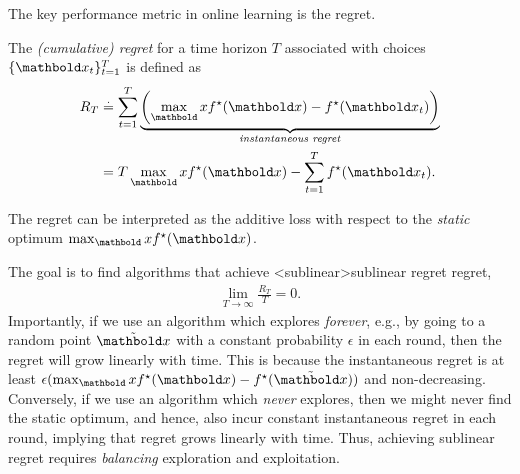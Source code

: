 The key performance metric in online learning is the regret.

\begin{defn}[Regret]
  The \emph{(cumulative) regret} for a time horizon $T$ associated with choices $\{\vx_t\}_{t=1}^T$ is defined as \begin{align}
    R_T &\defeq \sum_{t=1}^T \underbrace{\parentheses*{\max_\vx \opt{f}(\vx) - \opt{f}(\vx_t)}}_{\text{\midx{instantaneous regret}}} \\
    &= T \max_\vx \opt{f}(\vx) - \sum_{t=1}^T \opt{f}(\vx_t). \label{eq:regret2}
  \end{align}
\end{defn}
The regret can be interpreted as the additive loss with respect to the \emph{static} optimum $\max_\vx \opt{f}(\vx)$.

The goal is to find algorithms that achieve \midx<sublinear>{sublinear regret} regret, \begin{align}
  \lim_{T\to\infty} \frac{R_T}{T} = 0.
\end{align}
Importantly, if we use an algorithm which explores \emph{forever}, e.g., by going to a random point $\tilde{\vx}$ with a constant probability $\epsilon$ in each round, then the regret will grow linearly with time.
This is because the instantaneous regret is at least $\epsilon (\max_\vx \opt{f}(\vx) - \opt{f}(\tilde{\vx}))$ and non-decreasing.
Conversely, if we use an algorithm which \emph{never} explores, then we might never find the static optimum, and hence, also incur constant instantaneous regret in each round, implying that regret grows linearly with time.
Thus, achieving sublinear regret requires \emph{balancing} exploration and exploitation.

